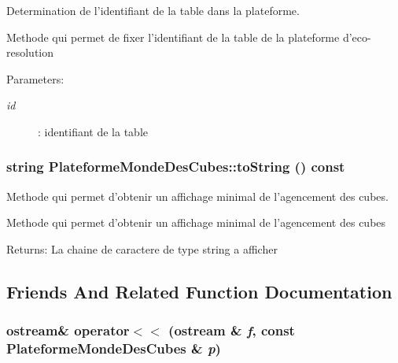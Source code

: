 Determination de l'identifiant de la table dans la plateforme. 

Methode qui permet de fixer l'identifiant de la table de la plateforme d'eco-resolution

\begin{Desc}
\item[Parameters:]
\begin{description}
\item[{\em id}]: identifiant de la table \end{description}
\end{Desc}
\hypertarget{classPlateformeMondeDesCubes_a834747e527529fd8c4bfc61bee6c20f}{
\subsubsection[{toString}]{\setlength{\rightskip}{0pt plus 5cm}string PlateformeMondeDesCubes::toString () const}}
\label{classPlateformeMondeDesCubes_a834747e527529fd8c4bfc61bee6c20f}


Methode qui permet d'obtenir un affichage minimal de l'agencement des cubes. 

Methode qui permet d'obtenir un affichage minimal de l'agencement des cubes

\begin{Desc}
\item[Returns:]La chaine de caractere de type string a afficher \end{Desc}


\subsection{Friends And Related Function Documentation}
\hypertarget{classPlateformeMondeDesCubes_98d6997efa9a51e23997364f1f09c7bd}{
\subsubsection[{operator$<$$<$}]{\setlength{\rightskip}{0pt plus 5cm}ostream\& operator$<$$<$ (ostream \& {\em f}, \/  const {\bf PlateformeMondeDesCubes} \& {\em p})}}
\label{classPlateformeMondeDesCubes_98d6997efa9a51e23997364f1f09c7bd}


